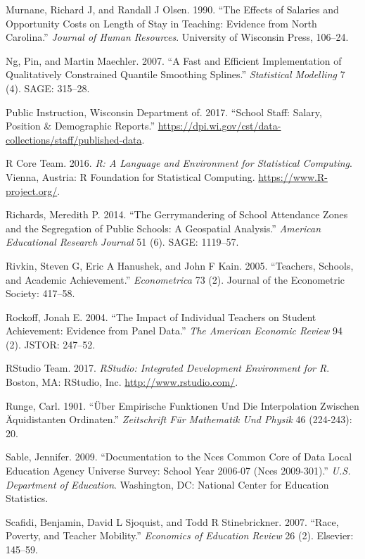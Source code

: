 \documentclass[12pt,]{article}
\begin{document}
\hypertarget{ref-murnane}{}
Murnane, Richard J, and Randall J Olsen. 1990. ``The Effects of Salaries
and Opportunity Costs on Length of Stay in Teaching: Evidence from North
Carolina.'' \emph{Journal of Human Resources}. University of Wisconsin
Press, 106--24.

\hypertarget{ref-ng}{}
Ng, Pin, and Martin Maechler. 2007. ``A Fast and Efficient
Implementation of Qualitatively Constrained Quantile Smoothing
Splines.'' \emph{Statistical Modelling} 7 (4). SAGE: 315--28.

\hypertarget{ref-dpi}{}
Public Instruction, Wisconsin Department of. 2017. ``School Staff:
Salary, Position \& Demographic Reports.''
\url{https://dpi.wi.gov/cst/data-collections/staff/published-data}.

\hypertarget{ref-r}{}
R Core Team. 2016. \emph{R: A Language and Environment for Statistical
Computing}. Vienna, Austria: R Foundation for Statistical Computing.
\url{https://www.R-project.org/}.

\hypertarget{ref-richards}{}
Richards, Meredith P. 2014. ``The Gerrymandering of School Attendance
Zones and the Segregation of Public Schools: A Geospatial Analysis.''
\emph{American Educational Research Journal} 51 (6). SAGE: 1119--57.

\hypertarget{ref-rivkin}{}
Rivkin, Steven G, Eric A Hanushek, and John F Kain. 2005. ``Teachers,
Schools, and Academic Achievement.'' \emph{Econometrica} 73 (2). Journal
of the Econometric Society: 417--58.

\hypertarget{ref-rockoff}{}
Rockoff, Jonah E. 2004. ``The Impact of Individual Teachers on Student
Achievement: Evidence from Panel Data.'' \emph{The American Economic
Review} 94 (2). JSTOR: 247--52.

\hypertarget{ref-rstudio}{}
RStudio Team. 2017. \emph{RStudio: Integrated Development Environment
for R}. Boston, MA: RStudio, Inc. \url{http://www.rstudio.com/}.

\hypertarget{ref-runge}{}
Runge, Carl. 1901. ``Über Empirische Funktionen Und Die Interpolation
Zwischen Äquidistanten Ordinaten.'' \emph{Zeitschrift Für Mathematik Und
Physik} 46 (224-243): 20.

\hypertarget{ref-sable}{}
Sable, Jennifer. 2009. ``Documentation to the Nces Common Core of Data
Local Education Agency Universe Survey: School Year 2006-07 (Nces
2009-301).'' \emph{U.S. Department of Education}. Washington, DC:
National Center for Education Statistics.

\hypertarget{ref-scafidi}{}
Scafidi, Benjamin, David L Sjoquist, and Todd R Stinebrickner. 2007.
``Race, Poverty, and Teacher Mobility.'' \emph{Economics of Education
Review} 26 (2). Elsevier: 145--59.
\end{document}
